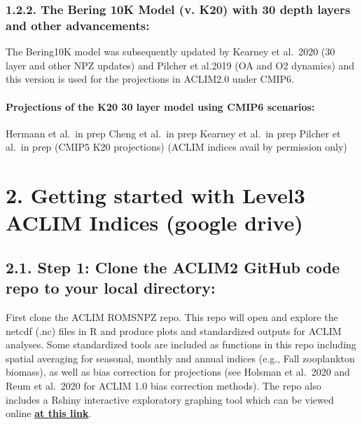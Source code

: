 \documentclass[
]{article}
\begin{document}
\hypertarget{the-bering-10k-model-v.-k20-with-30-depth-layers-and-other-advancements}{%
\subsubsection{1.2.2. The Bering 10K Model (v. K20) with 30 depth layers
and other
advancements:}\label{the-bering-10k-model-v.-k20-with-30-depth-layers-and-other-advancements}}

The Bering10K model was subsequently updated by Kearney et al.~2020 (30
layer and other NPZ updates) and Pilcher et al.2019 (OA and O2 dynamics)
and this version is used for the projections in ACLIM2.0 under CMIP6.

\hypertarget{projections-of-the-k20-30-layer-model-using-cmip6-scenarios}{%
\paragraph{Projections of the K20 30 layer model using CMIP6
scenarios:}\label{projections-of-the-k20-30-layer-model-using-cmip6-scenarios}}

Hermann et al.~in prep Cheng et al.~in prep Kearney et al.~in prep
Pilcher et al.~in prep (CMIP5 K20 projections) (ACLIM indices avail by
permission only)

\hypertarget{getting-started-with-level3-aclim-indices-google-drive}{%
\section{2. Getting started with Level3 ACLIM Indices (google
drive)}\label{getting-started-with-level3-aclim-indices-google-drive}}

\hypertarget{step-1-clone-the-aclim2-github-code-repo-to-your-local-directory}{%
\subsection{2.1. Step 1: Clone the ACLIM2 GitHub code repo to your local
directory:}\label{step-1-clone-the-aclim2-github-code-repo-to-your-local-directory}}

First clone the ACLIM ROMSNPZ repo. This repo will open and explore the
netcdf (.nc) files in R and produce plots and standardized outputs for
ACLIM analyses. Some standardized tools are included as functions in
this repo including spatial averaging for seasonal, monthly and annual
indices (e.g., Fall zooplankton biomass), as well as bias correction for
projections (see Holsman et al.~2020 and Reum et al.~2020 for ACLIM 1.0
bias correction methods). The repo also includes a Rshiny interactive
exploratory graphing tool which can be viewed online \href{}{\textbf{at
this link}}.
\end{document}
